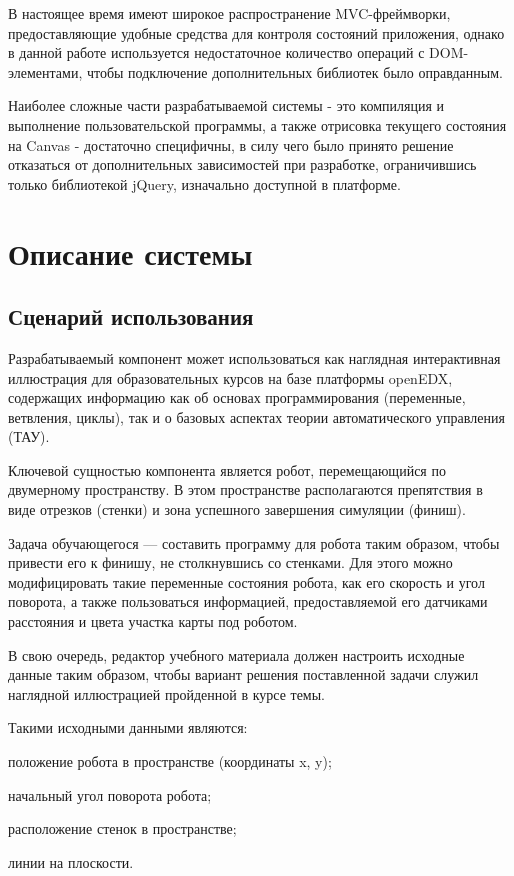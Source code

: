 В настоящее время имеют широкое распространение MVC-фреймворки, предоставляющие удобные средства для контроля состояний приложения, однако в данной работе используется недостаточное количество операций с DOM-элементами, чтобы подключение дополнительных библиотек было оправданным.


Наиболее сложные части разрабатываемой системы - это компиляция и выполнение пользовательской программы, а также отрисовка текущего состояния на Canvas - достаточно специфичны, в силу чего было принято решение отказаться от дополнительных зависимостей при разработке, ограничившись только библиотекой jQuery, изначально доступной в платформе.

\section{Описание системы}
\subsection{Сценарий использования}

Разрабатываемый компонент может использоваться как наглядная интерактивная иллюстрация для образовательных курсов на базе платформы openEDX, содержащих информацию как об основах программирования (переменные, ветвления, циклы), так и о базовых аспектах теории автоматического управления (ТАУ).


Ключевой сущностью компонента является робот, перемещающийся по двумерному пространству. В этом пространстве располагаются препятствия в виде отрезков (стенки) и зона успешного завершения симуляции (финиш).

Задача обучающегося — составить программу для робота таким образом, чтобы привести его к финишу, не столкнувшись со стенками. Для этого можно модифицировать такие переменные состояния робота, как его скорость и угол поворота, а также пользоваться информацией, предоставляемой его датчиками расстояния и цвета участка карты под роботом.

В свою очередь, редактор учебного материала должен настроить исходные данные таким образом, чтобы вариант решения поставленной задачи служил наглядной иллюстрацией пройденной в курсе темы.

Такими исходными данными являются:

\begin{itemize*}
	\item положение робота в пространстве (координаты x, y);
	\item начальный угол поворота робота;
	\item расположение стенок в пространстве;
	\item линии на плоскости.
\end{itemize*}

